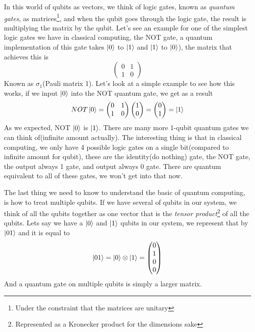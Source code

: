 \documentclass[english, a4paper, 12pt, twoside]{article}
\numberwithin{equation}{section} %
\begin{document}
In this world of qubits as vectors, we think of logic gates, known as \textit{quantum gates}, as matrices\footnote{Under the constraint that the matrices are unitary}, and when the qubit goes through the logic gate, the result is multiplying the matrix by the qubit. Let's see an example for one of the simplest logic gates we have in classical computing, the NOT gate, a quantum implementation of this gate takes $\ket{0}$ to $\ket{1}$ and $\ket{1}$ to $\ket{0}$), the matrix that achieves this is 
\[
\begin{pmatrix}
    0 & 1 \\
    1 & 0
\end{pmatrix}
\]
Known as $\sigma_1$(Pauli matrix 1). Let's look at a simple example to see how this works, if we input $\ket{0}$ into the NOT quantum gate, we get as a result
\[
NOT \ket{0} = 
\begin{pmatrix}
    0 & 1 \\
    1 & 0
\end{pmatrix}
\begin{pmatrix}
    1 \\
    0
\end{pmatrix} = 
\begin{pmatrix}
    0 \\
    1
\end{pmatrix} = \ket{1}
\]
As we expected, NOT $\ket{0}$ is $\ket{1}$. There are many more 1-qubit quantum gates we can think of(infinite amount actually). The interesting thing is that in classical computing, we only have 4 possible logic gates on a single bit(compared to infinite amount for qubit), these are the identity(do nothing) gate, the NOT gate, the output always 1 gate, and output always 0 gate. There are quantum equivalent to all of these gates, we won't get into that now.

The last thing we need to know to understand the basic of quantum computing, is how to treat multiple qubits. If we have several of qubits in our system, we think of all the qubits together as one vector that is the \textit{tensor product}\footnote{Represented as a Kronecker product for the dimensions sake} of all the qubits. Lets say we have a $\ket{0}$ and $\ket{1}$ qubits in our system, we represent that by $\ket{01}$ and it is equal to
\[\ket{01} = \ket{0} \otimes \ket{1} =
\begin{pmatrix}
    0 \\
    1 \\
    0 \\
    0
\end{pmatrix}\]
And a quantum gate on multiple qubits is simply a larger matrix.
\end{document}
